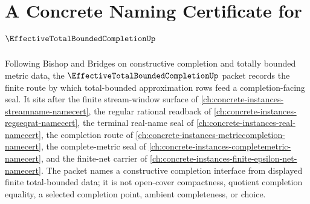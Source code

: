 \chapter{A Concrete Naming Certificate for $\EffectiveTotalBoundedCompletionUp$}
\label{ch:concrete-instances-effective-total-bounded-completion-namecert}

Following Bishop and Bridges on constructive completion and totally bounded metric data, the $\EffectiveTotalBoundedCompletionUp$ packet records the finite route by which total-bounded approximation rows feed a completion-facing seal. It sits after the finite stream-window surface of \autoref{ch:concrete-instances-streamname-namecert}, the regular rational readback of \autoref{ch:concrete-instances-regseqrat-namecert}, the terminal real-name seal of \autoref{ch:concrete-instances-real-namecert}, the completion route of \autoref{ch:concrete-instances-metriccompletion-namecert}, the complete-metric seal of \autoref{ch:concrete-instances-completemetric-namecert}, and the finite-net carrier of \autoref{ch:concrete-instances-finite-epsilon-net-namecert}. The packet names a constructive completion interface from displayed finite total-bounded data; it is not open-cover compactness, quotient completion equality, a selected completion point, ambient completeness, or choice.

